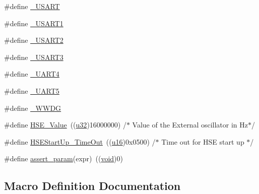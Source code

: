 \begin{DoxyCompactItemize}
\item 
\#define \hyperlink{bsp_2boards_2iot-lab___a8-_m3_2configure_2stm32f10x__conf_8h_a721f8180518da65e41da9183b51e3e8f}{\+\_\+\+U\+S\+A\+RT}
\item 
\#define \hyperlink{bsp_2boards_2iot-lab___a8-_m3_2configure_2stm32f10x__conf_8h_a87cc61af3196eff32399adcb150efc02}{\+\_\+\+U\+S\+A\+R\+T1}
\item 
\#define \hyperlink{bsp_2boards_2iot-lab___a8-_m3_2configure_2stm32f10x__conf_8h_ae4b518a21a49480699d8e1c72ee54ca1}{\+\_\+\+U\+S\+A\+R\+T2}
\item 
\#define \hyperlink{bsp_2boards_2iot-lab___a8-_m3_2configure_2stm32f10x__conf_8h_a1d0c868ba49fcc013de7cc9e9a7e4728}{\+\_\+\+U\+S\+A\+R\+T3}
\item 
\#define \hyperlink{bsp_2boards_2iot-lab___a8-_m3_2configure_2stm32f10x__conf_8h_af0db70c5bcd5675b2c9779656d440b6b}{\+\_\+\+U\+A\+R\+T4}
\item 
\#define \hyperlink{bsp_2boards_2iot-lab___a8-_m3_2configure_2stm32f10x__conf_8h_a14bc584303e9158a345f49add421ef23}{\+\_\+\+U\+A\+R\+T5}
\item 
\#define \hyperlink{bsp_2boards_2iot-lab___a8-_m3_2configure_2stm32f10x__conf_8h_a0805659aa3ffd3f906b888b0d36a3e13}{\+\_\+\+W\+W\+DG}
\item 
\#define \hyperlink{bsp_2boards_2iot-lab___a8-_m3_2configure_2stm32f10x__conf_8h_ab12a1abe6dd0001e7a0487a8b175b28c}{H\+S\+E\+\_\+\+Value}~((\hyperlink{agilefox_2library_2inc_2stm32f10x__type_8h_a2caf5cd7bcdbe1eefa727f44ffb10bac}{u32})16000000) /$\ast$ Value of the External oscillator in Hz$\ast$/
\item 
\#define \hyperlink{bsp_2boards_2iot-lab___a8-_m3_2configure_2stm32f10x__conf_8h_a7e69dacd5c3b950b5b1786d7336b30d3}{H\+S\+E\+Start\+Up\+\_\+\+Time\+Out}~((\hyperlink{agilefox_2library_2inc_2stm32f10x__type_8h_a9e6c91d77e24643b888dbd1a1a590054}{u16})0x0500) /$\ast$ Time out for H\+S\+E start up $\ast$/
\item 
\#define \hyperlink{bsp_2boards_2iot-lab___a8-_m3_2configure_2stm32f10x__conf_8h_a631dea7b230e600555f979c62af1de21}{assert\+\_\+param}(expr)~((\hyperlink{usb__devapi_8h_afabf60e7f57651d6d595a02c75f07cd0}{void})0)
\end{DoxyCompactItemize}


\subsection{Macro Definition Documentation}
